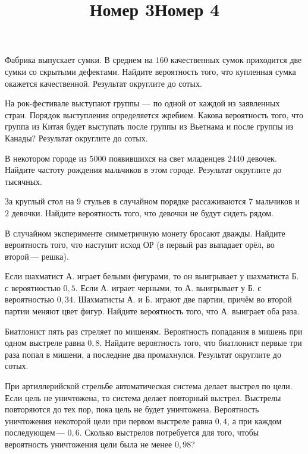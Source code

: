 \begin{consultation}
	\title{Номер 3}
	\begin{listofex}
		\item Фабрика выпускает сумки. В среднем на \( 160 \) качественных сумок приходится две сумки со скрытыми дефектами. Найдите вероятность того, что купленная сумка окажется качественной. Результат округлите до сотых.
		\item На рок-фестивале выступают группы  — по одной от каждой из заявленных стран. Порядок выступления определяется жребием. Какова вероятность того, что группа из Китая будет выступать после группы из Вьетнама и после группы из Канады? Результат округлите до сотых.
		\item В некотором городе из \( 5000 \) появившихся на свет младенцев \( 2440 \) девочек. Найдите частоту рождения мальчиков в этом городе. Результат округлите до тысячных.
		\item За круглый стол на \( 9 \) стульев в случайном порядке рассаживаются \( 7 \) мальчиков и \( 2 \) девочки. Найдите вероятность того, что девочки не будут сидеть рядом.
		\item В случайном эксперименте симметричную монету бросают дважды. Найдите вероятность того, что наступит исход ОР (в первый раз выпадает орёл, во второй --- решка).
	\end{listofex}
	\title{Номер 4}
	\begin{listofex}[resume]
		\item Если шахматист А. играет белыми фигурами, то он выигрывает у шахматиста Б. с вероятностью \( 0,5 \). Если А. играет черными, то А. выигрывает у Б. с вероятностью \( 0,34 \). Шахматисты А. и Б. играют две партии, причём во второй партии меняют цвет фигур. Найдите вероятность того, что А. выиграет оба раза.
		\item Биатлонист пять раз стреляет по мишеням. Вероятность попадания в мишень при одном выстреле равна \( 0,8 \). Найдите вероятность того, что биатлонист первые три раза попал в мишени, а последние два промахнулся. Результат округлите до сотых.
		\item При артиллерийской стрельбе автоматическая система делает выстрел по цели. Если цель не уничтожена, то система делает повторный выстрел. Выстрелы повторяются до тех пор, пока цель не будет уничтожена. Вероятность уничтожения некоторой цели при первом выстреле равна \( 0,4 \), а при каждом последующем --- \( 0,6 \). Сколько выстрелов потребуется для того, чтобы вероятность уничтожения цели была не менее \( 0,98 \)?

\end{listofex}
\end{consultation}
